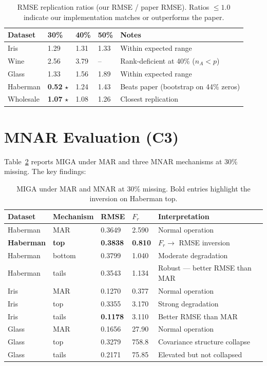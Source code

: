\begin{table}[h]
\caption{RMSE replication ratios (our RMSE / paper RMSE). Ratios $\leq 1.0$ indicate our implementation matches or outperforms the paper.}
\label{tab:replication}
\centering
\begin{tabular}{lllll}
\toprule
\textbf{Dataset} & \textbf{30\%} & \textbf{40\%} & \textbf{50\%} & \textbf{Notes} \\
\midrule
Iris      & 1.29 & 1.31 & 1.33 & Within expected range \\
Wine      & 2.56 & 3.79 & --   & Rank-deficient at 40\% ($n_A < p$) \\
Glass     & 1.33 & 1.56 & 1.89 & Within expected range \\
Haberman  & \textbf{0.52} $\star$ & 1.24 & 1.43 & Beats paper (bootstrap on 44\% zeros) \\
Wholesale & \textbf{1.07} $\star$ & 1.08 & 1.26 & Closest replication \\
\bottomrule
\end{tabular}
\end{table}

\section{MNAR Evaluation (C3)}

Table~\ref{tab:mnar} reports MIGA under MAR and three MNAR mechanisms at 30\% missing. The key findings:

\begin{table}[h]
\caption{MIGA under MAR and MNAR at 30\% missing. Bold entries highlight the inversion on Haberman top.}
\label{tab:mnar}
\centering
\begin{tabular}{lllll}
\toprule
\textbf{Dataset} & \textbf{Mechanism} & \textbf{RMSE} & $F_r$ & \textbf{Interpretation} \\
\midrule
Haberman & MAR    & 0.3649 & 2.590 & Normal operation \\
\textbf{Haberman} & \textbf{top}    & \textbf{0.3838} & \textbf{0.810} & $F_r \to$ RMSE inversion \\
Haberman & bottom & 0.3799 & 1.040 & Moderate degradation \\
Haberman & tails  & 0.3543 & 1.134 & Robust --- better RMSE than MAR \\
\midrule
Iris & MAR    & 0.1270 & 0.377 & Normal operation \\
Iris & top    & 0.3355 & 3.170 & Strong degradation \\
Iris & tails  & \textbf{0.1178} & 3.110 & Better RMSE than MAR \\
\midrule
Glass & MAR    & 0.1656 & 27.90 & Normal operation \\
Glass & top    & 0.3279 & 758.8 & Covariance structure collapse \\
Glass & tails  & 0.2171 & 75.85 & Elevated but not collapsed \\
\bottomrule
\end{tabular}
\end{table}

